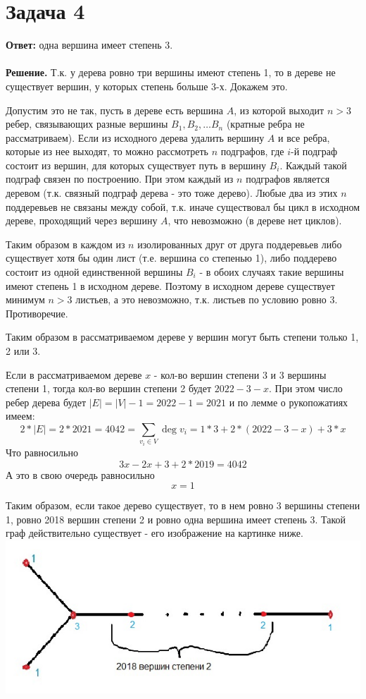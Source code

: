 \documentclass{article}
\begin{document}
\section*{Задача 4}
{\bf Ответ:} одна вершина имеет степень 3.
\\
\\
{\bf Решение.} Т.к. у дерева ровно три вершины имеют степень 1, то в дереве не существует вершин, у которых степень больше 3-х. Докажем это.
\par
Допустим это не так, пусть в дереве есть вершина $A$, из которой выходит $n>3$ ребер, связывающих разные вершины $B_1, B_2,\dots B_n$ (кратные ребра не рассматриваем). Если из исходного дерева удалить вершину $A$ и все ребра, которые из нее выходят, то можно рассмотреть $n$ подграфов, где $i$-й подграф состоит из вершин, для которых существует путь в вершину $B_i$. Каждый такой подграф связен по построению.  При этом каждый из $n$ подграфов является деревом (т.к. связный подграф дерева - это тоже дерево).  Любые два из этих $n$ поддеревьев не связаны между собой, т.к. иначе существовал бы цикл в исходном дереве, проходящий через вершину $A$, что невозможно (в дереве нет циклов). 
\par
Таким образом в каждом из $n$ изолированных друг от друга поддеревьев либо существует хотя бы один лист (т.е. вершина со степенью 1), либо поддерево состоит из одной единственной вершины $B_i$ - в обоих случаях такие вершины имеют степень 1 в исходном дереве. Поэтому в исходном дереве существует минимум $n > 3$ листьев, а это невозможно, т.к. листьев по условию ровно 3. Противоречие. 
\par
Таким образом в рассматриваемом дереве у вершин могут быть степени только 1, 2 или 3.
\par
Если в рассматриваемом дереве $x$ - кол-во вершин степени $3$ и 3 вершины степени 1, тогда кол-во вершин степени 2 будет $2022-3-x$.  При этом число ребер дерева будет $|E|=|V|-1 = 2022 - 1 = 2021$  и по лемме о рукопожатиях имеем:
$$2*|E| = 2*2021 = 4042 = \sum_{v_i\in V}\deg{v_i}=1*3+2*(2022-3-x)+3*x$$
Что равносильно
$$3x - 2x + 3+2*2019 = 4042$$
А это в свою очередь равносильно
$$x = 1$$
\par
Таким образом, если такое дерево существует, то в нем ровно 3 вершины степени 1, ровно 2018 вершин степени 2 и ровно одна вершина имеет степень 3. Такой граф действительно существует - его изображение на картинке ниже.
\\
{\includegraphics[scale=0.6]{img/img3.jpg}}
\end{document}
